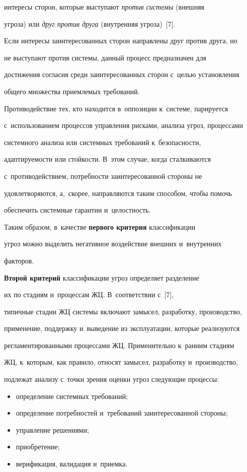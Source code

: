 интересы сторон, которые выступают \textit{против системы} (внешняя 

угроза) или \textit{друг против друга} (внут\-рен\-няя угроза)~[7]. 

Если интересы заинтересованных сторон направлены друг против друга, но 

не выступают против системы, данный процесс предназначен для 

достижения согласия среди заинтересованных сторон с~целью установления 

общего множества приемлемых требований. 

    

    Противодействие тех, кто находится в~оппозиции к~сис\-те\-ме, парируется 

с~использованием процессов управ\-ле\-ния рисками, анализа угроз, процессами 

сис\-тем\-но\-го анализа или системных требований к~безопас\-ности, 

адаптируемости или стойкости. В~этом случае, когда сталкиваются 

с~противодействием, потребности заинтересованной стороны не 

удовлетворяются, а,~скорее, направляются таким способом, чтобы помочь 

обеспечить системные гарантии и~целостность.

    

    Таким образом, в~качестве \textbf{первого критерия} классификации 

угроз можно выделить негативное воздействие внешних и~внутренних 

факторов.

    

    \textbf{Второй критерий} классификации угроз определяет разделение 

их по стадиям и~процессам ЖЦ. В~соответствии с~[7], 

типичные стадии ЖЦ системы включают замысел, разработку, производство, 

применение, поддержку и~выведение из эксплуатации, которые реализуются 

регламентированными процессами ЖЦ. Применительно к~ранним стадиям 

ЖЦ, к~которым, как правило, относят замысел, разработку и~производство, 

подлежат анализу с~точки зрения оценки угроз следующие процессы:

    \begin{itemize}

\item определение системных требований;

\item определение потребностей и~требований заинтересованной стороны;

\item управление решениями;

\item приобретение;

\item верификация, валидация и~приемка. 

\end{itemize}



